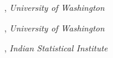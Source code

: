 
, \textit{University of Washington}	\hfill 

, \textit{University of Washington} \hfill	

, \textit{Indian Statistical Institute} \hfill 
